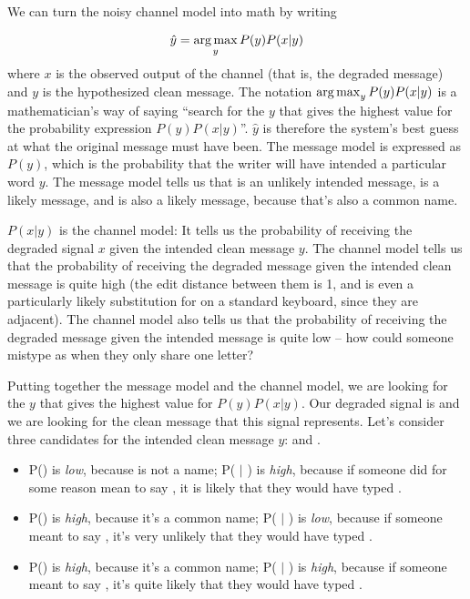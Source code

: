 We can turn the noisy channel model into math by writing

\begin{equation}
	\hat{y} = \operatorname*{arg\,max}_y P(y)P(x|y)
\end{equation}
where \(x\) is the observed output of the channel (that is, the
degraded message) and \(y\) is the hypothesized clean message.  The notation \(
\operatorname*{arg\,max}_y P(y)P(x|y) \) is a mathematician's way of saying ``search for
the \(y\) that gives the highest value for the probability expression
\(P(y)P(x|y)\)''. \(\hat{y}\) is therefore the system's best guess at
what the original message must have been. The message model is
expressed as \(P(y)\), which is the probability that the writer will
have intended a particular word $y$. The message model tells us that 
is an unlikely intended message,  is a likely message, and  is also a likely message, because that's also a common name.

\(P(x|y)\) is the channel model:  It tells us the probability of  receiving the degraded signal $x$ given the intended clean message $y$.  The channel model tells us that the probability of receiving the degraded message  given the intended clean message  is quite high (the edit distance between them is 1, and  is even a particularly likely substitution for  on a standard keyboard, since they are adjacent).  The channel model also tells us that the probability of receiving the degraded message  given the intended message  is quite low -- how could someone mistype  as  when they only share one letter? 

Putting together the message model and the channel model, we are looking for the $y$ that gives the highest value for $P(y) P(x | y)$.  Our degraded signal is  and we are looking for the clean message that this signal represents.  Let's consider three candidates for the intended clean message $y$:   and .

\begin{itemize}

\item P() is \emph{low}, because  is not a name; P( $|$ ) is \emph{high}, because if someone did for some reason mean to say , it is likely that they would have typed .

\item P() is \emph{high}, because it's a common name; P( $|$ ) is \emph{low}, because if someone meant to say , it's very unlikely that they would have typed .

\item P() is \emph{high}, because it's a common name; P( $|$ ) is \emph{high}, because if someone meant to say , it's quite likely that they would have typed . 

\end{itemize}

